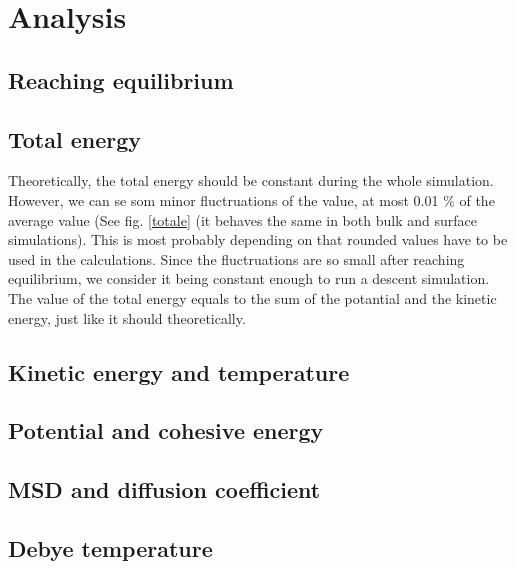 \section{Analysis}

\subsection{Reaching equilibrium}

\subsection{Total energy}
Theoretically, the total energy should be constant during the whole simulation. However, we can se som minor fluctruations of the value, at most 0.01 \% of the average value (See fig. \ref{totale} (it behaves the same in both bulk and surface simulations). This is most probably depending on that rounded values have to be used in the calculations. Since the fluctruations are so small after reaching equilibrium, we consider it being constant enough to run a descent simulation. 
The value of the total energy equals to the sum of the potantial and the kinetic energy, just like it should theoretically.

\subsection{Kinetic energy and temperature}


\subsection{Potential and cohesive energy}

\subsection{MSD and diffusion coefficient}

\subsection{Debye temperature}


